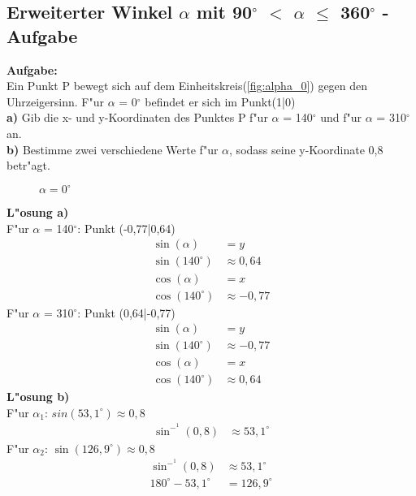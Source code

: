 \documentclass{standalone}
\begin{document}
\subsection{Erweiterter Winkel $\alpha$ mit 90$^\circ$  $<$ $\alpha$ $\leq$ 360$^\circ$  - Aufgabe}

\noindent\textbf{Aufgabe:}\\
Ein Punkt P bewegt sich auf dem Einheitskreis(\autoref{fig:alpha_0}) gegen den Uhrzeigersinn. F{"u}r $\alpha$ = 0$^\circ$  befindet er sich im Punkt(1|0)\\
\textbf{a)} Gib die x- und y-Koordinaten des Punktes P f{"u}r $\alpha$ = 140$^\circ$  und f{"u}r $\alpha$ = 310$^\circ$  an.\\
\textbf{b)} Bestimme zwei verschiedene Werte f{"u}r $\alpha$, sodass seine y-Koordinate 0,8 betr{"a}gt.\\

\begin{figure}[hb!]
  \centering
  \def\svgwidth{200px}
  
  \caption{$\alpha = 0^\circ $}
  \label{fig:alpha_0}
\end{figure}

\newpage

\noindent\textbf{L{"o}sung a)}\\
\noindent F{"u}r $\alpha$ = 140$^\circ$: Punkt (-0,77|0,64)
\begin{align}
  \sin(\alpha)     & = y \tag{1}           \\
  \sin(140^\circ ) & \approx 0,64 \tag{2}  \\
  \cos(\alpha)     & = x \tag{3}           \\
  \cos(140^\circ ) & \approx -0,77 \tag{4}
\end{align}
\noindent F{"u}r $\alpha$ = 310$^\circ$: Punkt (0,64|-0,77)
\begin{align}
  \sin(\alpha)     & = y \tag{1}           \\
  \sin(140^\circ ) & \approx -0,77 \tag{2} \\
  \cos(\alpha)     & = x \tag{3}           \\
  \cos(140^\circ ) & \approx 0,64 \tag{4}
\end{align}
\noindent\textbf{L{"o}sung b)}\\
\noindent F{"u}r $\alpha_1$: $sin(53,1^\circ) \approx 0,8$
\begin{align}
  \sin^-^1(0,8) & \approx 53,1^\circ \tag{1}
\end{align}
\noindent F{"u}r $\alpha_2$: $\sin(126,9^\circ) \approx 0,8$
\begin{align}
  \sin^-^1(0,8)          & \approx 53,1^\circ \tag{1} \\
  180^\circ - 53,1^\circ & = 126,9^\circ \tag{2}
\end{align}
\end{document}
